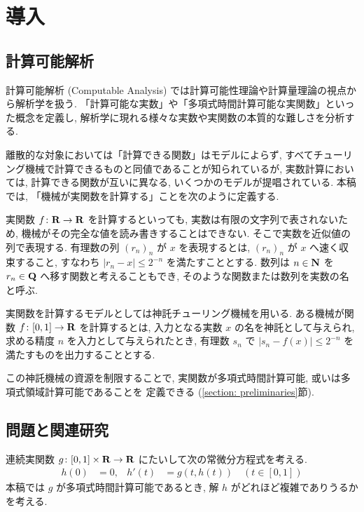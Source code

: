 \section{導入}

\subsection{計算可能解析}

計算可能解析 (Computable Analysis) では計算可能性理論や計算量理論の視点から解析学を扱う. 
「計算可能な実数」や「多項式時間計算可能な実関数」といった概念を定義し, 
解析学に現れる様々な実数や実関数の本質的な難しさを分析する. 

離散的な対象においては「計算できる関数」はモデルによらず,
すべてチューリング機械で計算できるものと同値であることが知られているが,
実数計算においては, 計算できる関数が互いに異なる, いくつかのモデルが提唱されている.
本稿では,
「機械が実関数を計算する」ことを次のように定義する.

実関数 $f \colon \mathbf R \to \mathbf R$ を計算するといっても,
実数は有限の文字列で表されないため,
機械がその完全な値を読み書きすることはできない.
そこで実数を近似値の列で表現する.
有理数の列 $(r_n)_n$ が $x$ を表現するとは,
$(r_n)_n$ が $x$ へ速く収束すること, 
すなわち $|r_n - x| \le 2^{-n}$ を満たすこととする.
数列は $n \in \mathbf N$ を $r_n \in \mathbf Q$ へ移す関数と考えることもでき,
そのような関数または数列を実数の名と呼ぶ.

実関数を計算するモデルとしては神託チューリング機械を用いる. 
ある機械が関数 $f \colon [0, 1] \to \mathbf R$ を計算するとは,
入力となる実数 $x$ の名を神託として与えられ,
求める精度 $n$ を入力として与えられたとき,
有理数 $s_n$ で $|s_n - f(x)| \le 2^{-n}$ を満たすものを出力することとする.

この神託機械の資源を制限することで, 
実関数が多項式時間計算可能, 或いは多項式領域計算可能であることを
定義できる (\ref{section: preliminaries}節).

\subsection{問題と関連研究}

連続実関数 $g \colon [0,1] \times \mathbf R \to \mathbf R$ にたいして次の常微分方程式を考える. 
\begin{align}
 \label{eq:ode}
 h(0) & = 0, &
 h'(t) & = g(t,h(t)) \quad (t \in [0,1])
\end{align}
本稿では $g$ が多項式時間計算可能であるとき, 
解 $h$ がどれほど複雑でありうるかを考える.

